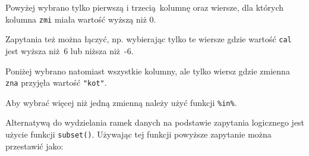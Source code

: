 \documentclass[paper=6in:9in,pagesize=pdftex,headinclude=on,footinclude=on,10pt]{scrbook}
\newenvironment{Shaded}{\begin{snugshade}}{\end{snugshade}}
\newcommand{\CommentTok}[1]{\textcolor[rgb]{0.56,0.35,0.01}{\textit{#1}}}
\newcommand{\DecValTok}[1]{\textcolor[rgb]{0.00,0.00,0.81}{#1}}
\newcommand{\KeywordTok}[1]{\textcolor[rgb]{0.13,0.29,0.53}{\textbf{#1}}}
\newcommand{\NormalTok}[1]{#1}
\newcommand{\OperatorTok}[1]{\textcolor[rgb]{0.81,0.36,0.00}{\textbf{#1}}}
\newcommand{\StringTok}[1]{\textcolor[rgb]{0.31,0.60,0.02}{#1}}
\begin{document}
Powyżej wybrano tylko pierwszą i trzecią~kolumnę oraz wiersze, dla których kolumna \texttt{zmi} miała wartość wyższą niż 0.

Zapytania też można łączyć, np. wybierając tylko te wiersze gdzie wartość \texttt{cal} jest wyższa niż~6 lub niższa niż~-6.

\begin{Shaded}
\end{Shaded}

Poniżej wybrano natomiast wszystkie kolumny, ale tylko wiersz gdzie zmienna \texttt{zna} przyjęła wartość \texttt{"kot"}.

\begin{Shaded}
\end{Shaded}

Aby wybrać więcej niż jedną zmienną należy użyć funkcji \texttt{\%in\%}.

\begin{Shaded}
\end{Shaded}

Alternatywą do wydzielania ramek danych na podstawie zapytania logicznego jest użycie funkcji \texttt{subset()}.
Używając tej funkcji powyższe zapytanie można przestawić jako:

\begin{Shaded}
\end{Shaded}
\end{document}

